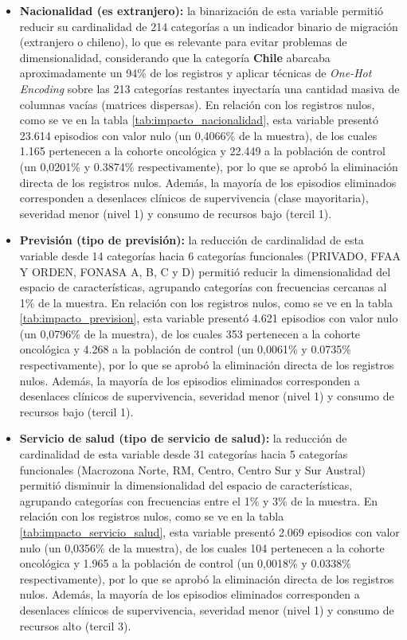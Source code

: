 \begin{itemize}
    \item \textbf{Nacionalidad (es extranjero):} la binarización de esta variable permitió reducir su cardinalidad de 214 categorías a un indicador binario de migración (extranjero o chileno), lo que es relevante para evitar problemas de dimensionalidad, considerando que la categoría \textbf{Chile} abarcaba aproximadamente un 94\% de los registros y aplicar técnicas de \textit{One-Hot Encoding} sobre las 213 categorías restantes inyectaría una cantidad masiva de columnas vacías (matrices dispersas). En relación con los registros nulos, como se ve en la tabla \ref{tab:impacto_nacionalidad}, esta variable presentó 23.614 episodios con valor nulo (un 0,4066\% de la muestra), de los cuales 1.165 pertenecen a la cohorte oncológica y 22.449 a la población de control (un 0,0201\% y 0.3874\% respectivamente), por lo que se aprobó la eliminación directa de los registros nulos. Además, la mayoría de los episodios eliminados corresponden a desenlaces clínicos de supervivencia (clase mayoritaria), severidad menor (nivel 1) y consumo de recursos bajo (tercil 1).
    \item \textbf{Previsión (tipo de previsión):} la reducción de cardinalidad de esta variable desde 14 categorías hacia 6 categorías funcionales (PRIVADO, FFAA Y ORDEN, FONASA A, B, C y D) permitió reducir la dimensionalidad del espacio de características, agrupando categorías con frecuencias cercanas al 1\% de la muestra. En relación con los registros nulos, como se ve en la tabla \ref{tab:impacto_prevision}, esta variable presentó 4.621 episodios con valor nulo (un 0,0796\% de la muestra), de los cuales 353 pertenecen a la cohorte oncológica y 4.268 a la población de control (un 0,0061\% y 0.0735\% respectivamente), por lo que se aprobó la eliminación directa de los registros nulos. Además, la mayoría de los episodios eliminados corresponden a desenlaces clínicos de supervivencia, severidad menor (nivel 1) y consumo de recursos bajo (tercil 1).
    \item \textbf{Servicio de salud (tipo de servicio de salud):} la reducción de cardinalidad de esta variable desde 31 categorías hacia 5 categorías funcionales (Macrozona Norte, RM, Centro, Centro Sur y Sur Austral) permitió disminuir la dimensionalidad del espacio de características, agrupando categorías con frecuencias entre el 1\% y 3\% de la muestra. En relación con los registros nulos, como se ve en la tabla \ref{tab:impacto_servicio_salud}, esta variable presentó 2.069 episodios con valor nulo (un 0,0356\% de la muestra), de los cuales 104 pertenecen a la cohorte oncológica y 1.965 a la población de control (un 0,0018\% y 0.0338\% respectivamente), por lo que se aprobó la eliminación directa de los registros nulos. Además, la mayoría de los episodios eliminados corresponden a desenlaces clínicos de supervivencia, severidad menor (nivel 1) y consumo de recursos alto (tercil 3).

\end{itemize}
